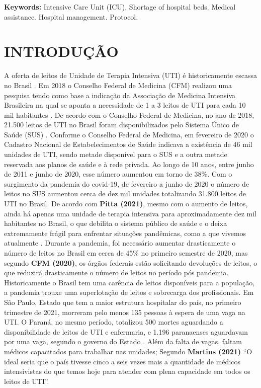\documentclass[12pt]{article}
\begin{document}
\textbf{Keywords:} Intensive Care Unit (ICU). Shortage of hospital beds. Medical assistance. Hospital management. Protocol.

\section{INTRODUÇÃO}
A oferta de leitos de Unidade de Terapia Intensiva (UTI) é historicamente escassa no Brasil \cite{murthy2015intensive}. Em 2018 o Conselho Federal de Medicina (CFM) realizou uma pesquisa tendo como base a indicação da Associação de Medicina Intensiva Brasileira na qual se aponta a necessidade de 1 a 3 leitos de UTI para cada 10 mil habitantes \cite{domingues2018numero}. De acordo com o Conselho Federal de Medicina, no ano de 2018, 21.500 leitos de UTI no Brasil foram disponibilizados pelo Sistema Único de Saúde (SUS) \cite{cfm2018,cfm2020}.
Conforme o Conselho Federal de Medicina, em fevereiro de 2020 o Cadastro Nacional de Estabelecimentos de Saúde indicava a existência de 46 mil unidades de UTI, sendo metade disponível para o SUS e a outra metade reservada aos planos de saúde e à rede privada. Ao longo de 10 anos, entre junho de 2011 e junho de 2020, esse número aumentou em torno de 38\%. Com o surgimento da pandemia do covid-19, de fevereiro a junho de 2020 o número de leitos no SUS aumentou cerca de dez mil unidades totalizando 31.800 leitos de UTI no Brasil.
De acordo com \textbf{Pitta (2021)}, mesmo com o aumento de leitos, ainda há apenas uma unidade de terapia intensiva para aproximadamente dez mil habitantes no Brasil, o que debilita o sistema público de saúde e o deixa extremamente frágil para enfrentar situações pandêmicas, como a que vivemos atualmente \cite{pimentel2020design}. Durante a pandemia, foi necessário aumentar drasticamente o número de leitos no Brasil em cerca de 45\% no primeiro semestre de 2020, mas segundo \textbf{CFM (2020)}, os órgãos federais estão solicitando devoluções de leitos, o que reduzirá drasticamente o número de leitos no período pós pandemia.
Historicamente o Brasil tem uma carência de leitos disponíveis para a população, a pandemia trouxe uma superlotação de leitos e sobrecarga dos profissionais. Em São Paulo, Estado que tem a maior estrutura hospitalar do país, no primeiro trimestre de 2021, morreram pelo menos 135 pessoas à espera de uma vaga na UTI. O Paraná, no mesmo período, totalizou 500 mortes aguardando a disponibilidade de leitos de UTI e enfermaria, e 1.196 paranaenses aguardavam por uma vaga, segundo o governo do Estado \cite{fundacaooswaldocruz2021}. Além da falta de vagas, faltam médicos capacitados para trabalhar nas unidades; Segundo \textbf{Martins (2021)} “O ideal seria que o país tivesse cinco a seis vezes mais a quantidade de médicos intensivistas do que temos hoje para atender com plena capacidade em todos os leitos de UTI”.
\end{document}
